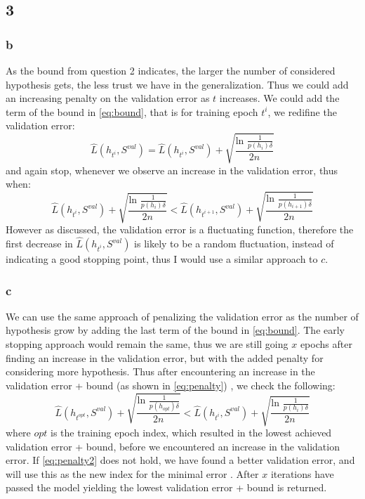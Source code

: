 \documentclass{article}
\begin{document}
\subsection{3}
\subsubsection{b}
As the bound from question 2 indicates, the larger the number of considered hypothesis gets, the less trust we have in the generalization. Thus we could add an increasing penalty on the validation error as $t$ increases. We could add the term of the bound in \eqref{eq:bound}, that is for training epoch $t^i$, we redifine the validation error:
\begin{equation}
\hat{L}(h_{t^i},S^{val}) = \hat{L}(h_{t^i},S^{val}) + \sqrt{\dfrac{\text{ln } \frac{1}{p(h_i) \delta}}{2n}}
\end{equation}
and again stop, whenever we observe an increase in the validation error, thus when:
\begin{equation}
\label{eq:penalty}
\hat{L}(h_{t^i},S^{val}) + \sqrt{\dfrac{\text{ln } \frac{1}{p(h_i) \delta}}{2n}} < \hat{L}(h_{t^{i+1}},S^{val}) + \sqrt{\dfrac{\text{ln } \frac{1}{p(h_{i+1}) \delta}}{2n}}
\end{equation}
However as discussed, the validation error is a fluctuating function, therefore the first decrease in  $\hat{L}(h_{t^i},S^{val})$ is likely to be a random fluctuation, instead of indicating a good stopping point, thus I would use a similar approach to $c$.
\subsubsection{c}
We can use the same approach of penalizing the validation error as the number of hypothesis grow by adding the last term of the bound in \eqref{eq:bound}. The early stopping approach would remain the same, thus we are still going $x$ epochs after finding an increase in the validation error, but with the added penalty for considering more hypothesis. Thus after encountering an increase in the validation error + bound (as shown in \eqref{eq:penalty}) , we check the following:
\begin{equation}
\label{eq:penalty2}
\hat{L}(h_{t^{opt}},S^{val}) + \sqrt{\dfrac{\text{ln } \frac{1}{p(h_{opt}) \delta}}{2n}} < \hat{L}(h_{t^{i}},S^{val}) + \sqrt{\dfrac{\text{ln } \frac{1}{p(h_i) \delta}}{2n}}
\end{equation}
where ${opt}$ is the training epoch index, which resulted in the lowest achieved validation error + bound, before we encountered an increase in the validation error. If \eqref{eq:penalty2} does not hold, we have found a better validation error, and will use this as the new index for the minimal error . After $x$ iterations have passed the model yielding the lowest validation error + bound is returned.
\end{document}
